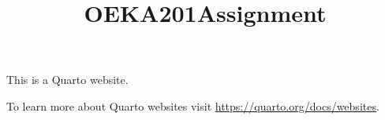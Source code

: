 \documentclass[
  letterpaper,
  DIV=11,
  numbers=noendperiod]{scrartcl}
\title{OEKA201Assignment}
\author{}
\date{}
\renewcommand*\contentsname{Table of contents}
\newcommand\contentsname{Table of contents}
\begin{document}
\maketitle

\renewcommand*\contentsname{Table of contents}
{
\hypersetup{linkcolor=}
\setcounter{tocdepth}{3}
\tableofcontents
}

This is a Quarto website.

To learn more about Quarto websites visit
\url{https://quarto.org/docs/websites}.
\end{document}
